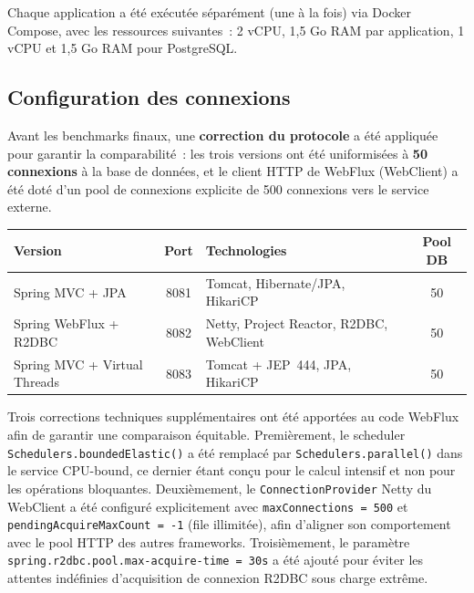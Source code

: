 \noindent Chaque application a été exécutée séparément (une à la fois) via Docker Compose, avec les
ressources suivantes~: 2 vCPU, 1,5 Go RAM par application, 1 vCPU et 1,5 Go RAM pour PostgreSQL.

\subsection*{Configuration des connexions}

Avant les benchmarks finaux, une \textbf{correction du protocole} a été appliquée pour garantir
la comparabilité~: les trois versions ont été uniformisées à \textbf{50 connexions} à la base de
données, et le client HTTP de WebFlux (WebClient) a été doté d'un pool de connexions explicite de
500 connexions vers le service externe.

\begin{center}
\begin{tabular}{|L{4cm}|c|L{4.5cm}|c|}
\hline
\textbf{Version}            & \textbf{Port} & \textbf{Technologies}                        & \textbf{Pool DB} \\
\hline
Spring MVC + JPA            & 8081          & Tomcat, Hibernate/JPA, HikariCP              & 50 \\
Spring WebFlux + R2DBC      & 8082          & Netty, Project Reactor, R2DBC, WebClient     & 50 \\
Spring MVC + Virtual Threads& 8083          & Tomcat + JEP~444, JPA, HikariCP              & 50 \\
\hline
\end{tabular}
\end{center}

Trois corrections techniques supplémentaires ont été apportées au code WebFlux afin de garantir
une comparaison équitable. Premièrement, le scheduler \texttt{Schedulers.boundedElastic()} a été
remplacé par \texttt{Schedulers.parallel()} dans le service CPU-bound, ce dernier étant conçu pour
le calcul intensif et non pour les opérations bloquantes. Deuxièmement, le \texttt{ConnectionProvider}
Netty du WebClient a été configuré explicitement avec \texttt{maxConnections~= 500} et
\texttt{pendingAcquireMaxCount~= -1} (file illimitée), afin d'aligner son comportement avec le
pool HTTP des autres frameworks. Troisièmement, le paramètre
\texttt{spring.r2dbc.pool.max-acquire-time~= 30s} a été ajouté pour éviter les attentes
indéfinies d'acquisition de connexion R2DBC sous charge extrême.

